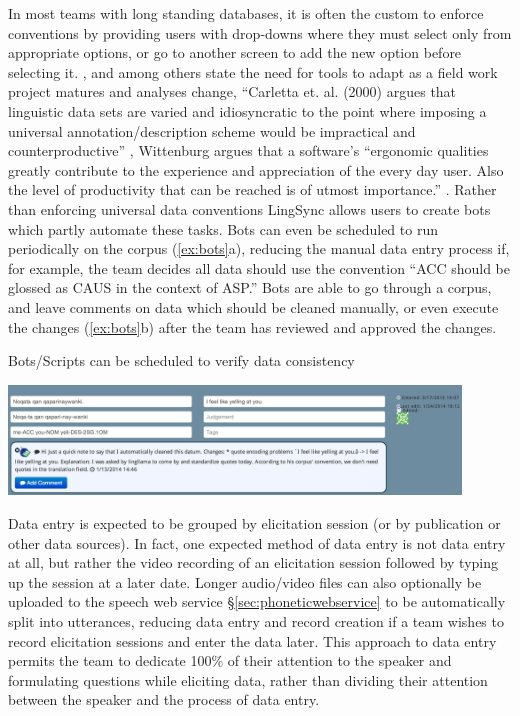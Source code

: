 \documentclass[letterpaper, 12pt, dvips]{mitwpl}
\begin{document}
In most teams with long standing databases,
it is often the custom to enforce conventions by providing users with drop-downs where they must select only from appropriate options,
or go to another screen to add the new option before selecting it.
\cite{Palmer:2009}, \cite{Cihlar:2008}  and \cite{Wittenburg:2006} among others state the need for tools to adapt as a field work project matures and analyses change, 
``Carletta et. al. (2000) argues that linguistic data sets are varied and idiosyncratic to the point where imposing a universal annotation/description scheme would be impractical and counterproductive''   \cite[p.11]{Cihlar:2008}, Wittenburg argues that a software's ``ergonomic qualities greatly contribute to the experience and appreciation of the every day user. Also the level of productivity that can be reached is of utmost importance.'' \citep[p.1559]{Wittenburg:2006}.
Rather than enforcing universal data conventions
LingSync allows users to create bots which partly automate these tasks.
Bots can even be scheduled to run periodically on the corpus (\ref{ex:bots}a),
reducing the manual data entry process if,
for example,
the team decides all data should use the convention ``ACC should be glossed as CAUS in the context of ASP.'' Bots are able to go through a corpus,
and leave comments on data which should be cleaned manually,
or even execute the changes (\ref{ex:bots}b) after the team has reviewed and approved the changes.

\begin{exe} 
\ex Bots/Scripts can be scheduled to verify data consistency

\hspace{-1in}
 \centering
   \includegraphics[width=0.9\textwidth]{spreadsheetbotcomment}

\label{ex:bots}
\end{exe}



Data entry is expected to be grouped by elicitation session (or by publication or other data sources).
In fact,
one expected method of data entry is not data entry at all,
but rather the video recording of an elicitation session followed by typing up the session at a later date.
Longer audio/video files can also optionally be uploaded to the speech web service \S \ref{sec:phoneticwebservice} to be automatically split into utterances,
 reducing data entry and record creation if a team wishes to record elicitation sessions and enter the data later.
 This approach to data entry permits the team to dedicate 100\% of their attention to the speaker and formulating questions while eliciting data,
rather than dividing their attention between the speaker and the process of data entry.
\end{document}
